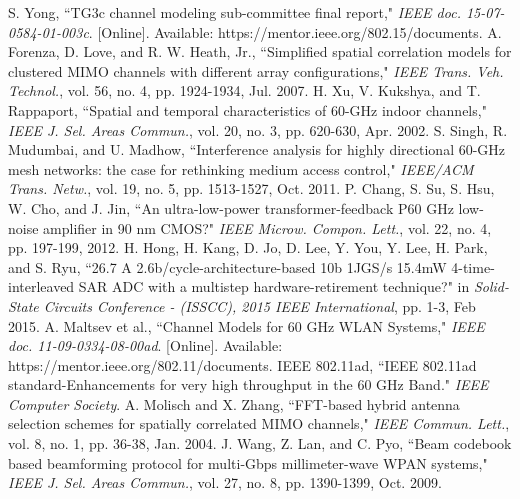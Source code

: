 \documentclass[11pt,draftcls,onecolumn]{IEEEtran}
\begin{document}
\begin{small}
\begin{thebibliography}{30}
S. Yong, ``TG3c channel modeling sub-committee final report," \emph{IEEE doc. 15-07-0584-01-003c}. [Online]. Available: https://mentor.ieee.org/802.15/documents.
A. Forenza, D. Love, and R. W. Heath, Jr., ``Simplified spatial correlation models for clustered MIMO channels with different array configurations," \emph{IEEE Trans. Veh. Technol.}, vol. 56, no. 4, pp. 1924-1934, Jul. 2007.
H. Xu, V. Kukshya, and T. Rappaport, ``Spatial and temporal characteristics of 60-GHz indoor channels," \emph{IEEE J. Sel. Areas Commun.}, vol. 20, no. 3, pp. 620-630, Apr. 2002.
S. Singh, R. Mudumbai, and U. Madhow, ``Interference analysis for highly directional 60-GHz mesh networks: the case for rethinking medium access control," \emph{IEEE/ACM Trans. Netw.}, vol. 19, no. 5, pp. 1513-1527, Oct. 2011.
P. Chang, S. Su, S. Hsu, W. Cho, and J. Jin, ``An ultra-low-power transformer-feedback P60 GHz low-noise amplifier in 90 nm CMOS?" \emph{IEEE Microw. Compon. Lett.}, vol. 22, no. 4, pp. 197-199, 2012.
H. Hong, H. Kang, D. Jo, D. Lee, Y. You, Y. Lee, H. Park, and S. Ryu, ``26.7 A 2.6b/cycle-architecture-based 10b 1JGS/s 15.4mW 4-time-interleaved SAR ADC with a multistep hardware-retirement technique?" in \emph{Solid- State Circuits Conference - (ISSCC), 2015 IEEE International}, pp. 1-3, Feb 2015.
A. Maltsev et al., ``Channel Models for 60 GHz WLAN Systems," \emph{IEEE doc. 11-09-0334-08-00ad}. [Online]. Available: https://mentor.ieee.org/802.11/documents.
IEEE 802.11ad, ``IEEE 802.11ad standard-Enhancements for very high throughput in the 60 GHz Band." \emph{IEEE Computer Society}.
A. Molisch and X. Zhang, ``FFT-based hybrid antenna selection schemes for spatially correlated MIMO channels," \emph{IEEE Commun. Lett.}, vol. 8, no. 1, pp. 36-38, Jan. 2004.
J. Wang, Z. Lan, and C. Pyo, ``Beam codebook based beamforming protocol for multi-Gbps millimeter-wave WPAN systems," \emph{IEEE J. Sel. Areas Commun.}, vol. 27, no. 8, pp. 1390-1399, Oct. 2009.


\end{thebibliography}
\end{small}
\end{document}
